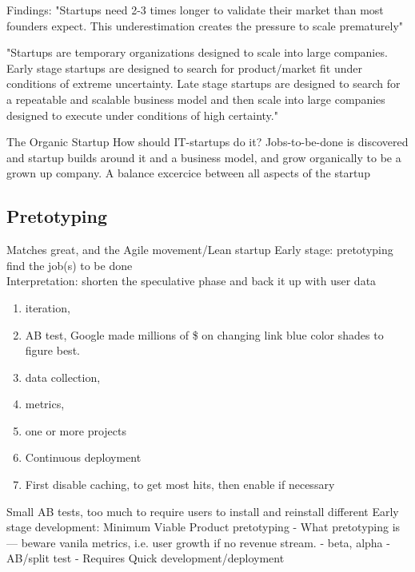 \documentclass[a4paper,10pt]{book}
\begin{document}
Findings:
"Startups need 2-3 times longer to validate their market than most founders
expect. This underestimation creates the pressure to scale prematurely"

"Startups are temporary organizations designed to scale into large companies.
Early stage startups are designed to search for product/market fit under
conditions of extreme uncertainty. Late stage startups are designed to search for
a repeatable and scalable business model and then scale into large companies
designed to execute under conditions of high certainty."

The Organic Startup
 How should IT-startups do it? Jobs-to-be-done is discovered and startup builds around it and a business model, and grow organically
 to be a grown up company.
 A balance excercice between all aspects of the startup
 

\subsection{Pretotyping}
Matches great, and the Agile movement/Lean startup
Early stage: pretotyping find the job(s) to be done
\\
Interpretation: shorten the speculative phase and back it up with user data
\begin{enumerate}
\item iteration, 
\item AB test, Google made millions of \$ on changing link blue color shades to figure best.
\item data collection, 
\item metrics, 
\item one or more projects
\item Continuous deployment
\item First disable caching, to get most hits, then enable if necessary
\end{enumerate}

Small AB tests, too much to require users to install and reinstall different
Early stage development: Minimum Viable Product pretotyping
 - What pretotyping is
  --- beware vanila metrics, i.e. user growth if no revenue stream.
 - beta, alpha
 - AB/split test
 - Requires Quick development/deployment
 
\end{document}
